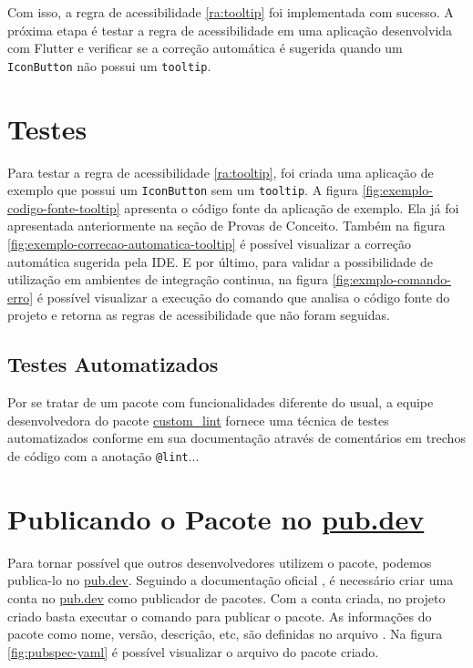 Com isso, a regra de acessibilidade \ref{ra:tooltip} foi implementada com sucesso. A próxima etapa é testar a regra de acessibilidade em uma aplicação desenvolvida com Flutter e verificar se a correção automática é sugerida quando um \texttt{IconButton} não possui um \texttt{tooltip}.

\section{Testes}

Para testar a regra de acessibilidade \ref{ra:tooltip}, foi criada uma aplicação de exemplo que possui um \texttt{IconButton} sem um \texttt{tooltip}. A figura \ref{fig:exemplo-codigo-fonte-tooltip} apresenta o código fonte da aplicação de exemplo. Ela já foi apresentada anteriormente na seção de Provas de Conceito. Também na figura \ref{fig:exemplo-correcao-automatica-tooltip} é possível visualizar a correção automática sugerida pela IDE. E por último, para validar a possibilidade de utilização em ambientes de integração continua, na figura \ref{fig:exmplo-comando-erro} é possível visualizar a execução do comando  que analisa o código fonte do projeto e retorna as regras de acessibilidade que não foram seguidas.

\subsection{Testes Automatizados}

Por se tratar de um pacote com funcionalidades diferente do usual, a equipe desenvolvedora do pacote \href{https://pub.dev/packages/custom_lint}{custom\_lint} fornece uma técnica de testes automatizados conforme em sua documentação \cite{customlintbuilder} através de comentários em trechos de código com a anotação \texttt{@lint}...

\section{Publicando o Pacote no \href{https://pub.dev/}{pub.dev}}

Para tornar possível que outros desenvolvedores utilizem o pacote, podemos publica-lo no \href{https://pub.dev/}{pub.dev}. Seguindo a documentação oficial \cite{pubdotdevpublish}, é necessário criar uma conta no \href{https://pub.dev/}{pub.dev} como publicador de pacotes. Com a conta criada, no projeto criado basta executar o comando  para publicar o pacote. As informações do pacote como nome, versão, descrição, etc, são definidas no arquivo . Na figura \ref{fig:pubspec-yaml} é possível visualizar o arquivo  do pacote criado.

